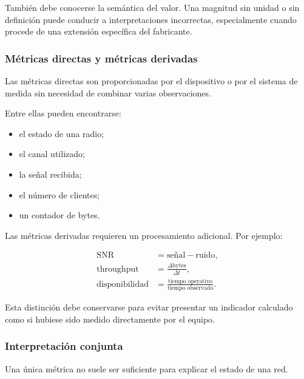 También debe conocerse la semántica del valor. Una magnitud sin unidad o
sin definición puede conducir a interpretaciones incorrectas,
especialmente cuando procede de una extensión específica del fabricante.


\subsubsection*{Métricas directas y métricas derivadas}

Las métricas directas son proporcionadas por el dispositivo o por el
sistema de medida sin necesidad de combinar varias observaciones.

Entre ellas pueden encontrarse:

\begin{itemize}
    \item el estado de una radio;

    \item el canal utilizado;

    \item la señal recibida;

    \item el número de clientes;

    \item un contador de bytes.
\end{itemize}

Las métricas derivadas requieren un procesamiento adicional. Por ejemplo:

\[
\begin{aligned}
    \text{SNR}
    &=
    \text{señal}
    -
    \text{ruido},\\
    \text{throughput}
    &=
    \frac{
        \Delta\text{bytes}
    }{
        \Delta t
    },\\
    \text{disponibilidad}
    &=
    \frac{
        \text{tiempo operativo}
    }{
        \text{tiempo observado}
    }.
\end{aligned}
\]

Esta distinción debe conservarse para evitar presentar un indicador
calculado como si hubiese sido medido directamente por el equipo.


\subsubsection*{Interpretación conjunta}

Una única métrica no suele ser suficiente para explicar el estado de una
red.

